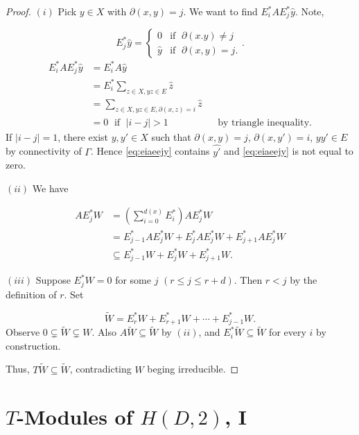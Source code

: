 \documentclass[
]{book}
\theoremstyle{definition}
\theoremstyle{definition}
\theoremstyle{definition}
\theoremstyle{definition}
\theoremstyle{remark}
\begin{document}
\begin{proof}
\leavevmode

\((i)\) Pick \(y\in X\) with \(\partial(x,y) = j\). We want to find \(E_i^*AE^*_j \hat{y}\). Note,

\[E_j^*\hat{y} = \begin{cases} 0 & \text{if }\; \partial(x.y)\neq j\\
\hat{y} & \text{if }\; \partial(x,y) = j.\end{cases}.\]
\begin{align}
E_i^*AE_j^*\hat{y} &= E_i^*A\hat{y} \\
& = E_i^*\sum_{z\in X, yz\in E}\hat{z}\\
& = \sum_{z\in X, yz\in E, \partial(x, z) = i}\hat{z}  \label{eq:eiaeejy}\\
& = 0 \; \text{ if }\; |i-j|>1 && \text{by triangle inequality.}
\end{align}
If \(|i-j| = 1\), there exist \(y, y'\in X\) such that \(\partial(x,y) = j\), \(\partial(x,y') = i\), \(yy'\in E\) by connectivity of \(\Gamma\). Hence
\eqref{eq:eiaeejy} contains \(\widehat{y'}\) and \eqref{eq:eiaeejy} is not equal to zero.

\((ii)\) We have

\begin{align}
AE_j^*W & = \left(\sum_{i=0}^{d(x)}E_i^*\right)AE_j^*W\\
& = E_{j-1}^*AE^*_jW + E^*_jAE_j^*W + E^*_{j+1}AE_j^*W\\
& \subseteq E^*_{j-1}W + E^*_jW + E^*_{j+1}W.
\end{align}

\((iii)\) Suppose \(E_j^*W = 0\) for some \(j\) \((r\leq j \leq r+d)\). Then \(r < j\) by the definition of \(r\). Set

\[\widetilde{W} = E^*_rW + E^*_{r+1}W + \cdots + E^*_{j-1}W.\]
Observe \(0\subsetneq \widetilde{W} \subsetneq W\).
Also \(A\widetilde{W} \subseteq \widetilde{W}\) by \((ii)\), and \(E_i^*\widetilde{W} \subseteq \widetilde{W}\) for every \(i\) by construction.

Thus, \(T\widetilde{W} \subseteq \widetilde{W}\), contradicting \(W\) beging irreducible.

\end{proof}

\hypertarget{lec5}{%
\chapter{\texorpdfstring{\(T\)-Modules of \(H(D,2)\), I}{T-Modules of H(D,2), I}}\label{lec5}}
\end{document}
